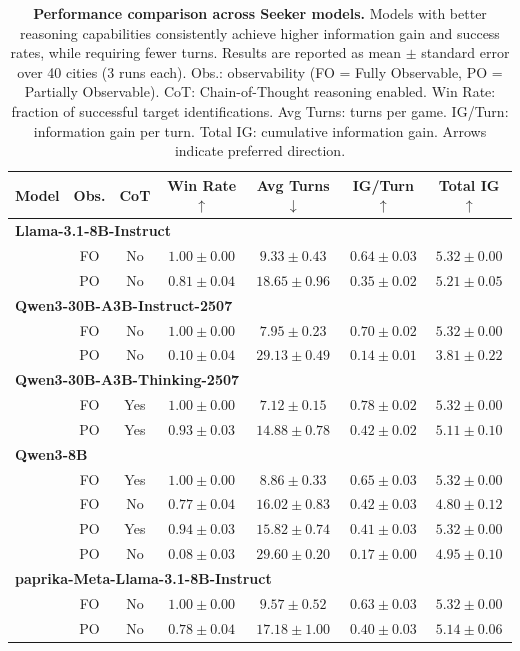 \documentclass[letterpaper]{article} %
\begin{document}
\begin{table}[t]
\centering
\setlength{\tabcolsep}{1.0mm}
\small
\begin{tabular}{lcccccc}
\toprule
\textbf{Model} & \textbf{Obs.} & \textbf{CoT} & \textbf{Win Rate} $\uparrow$ & \textbf{Avg Turns} $\downarrow$ & \textbf{IG/Turn} $\uparrow$ & \textbf{Total IG} $\uparrow$ \\
\midrule
\multicolumn{7}{l}{\textbf{Llama-3.1-8B-Instruct}} \\
    & FO & No & $1.00 \pm 0.00$ & $9.33 \pm 0.43$ & $0.64 \pm 0.03$ & $5.32 \pm 0.00$ \\
    & PO & No & $0.81 \pm 0.04$ & $18.65 \pm 0.96$ & $0.35 \pm 0.02$ & $5.21 \pm 0.05$ \\
\midrule
\multicolumn{7}{l}{\textbf{Qwen3-30B-A3B-Instruct-2507}} \\
    & FO & No & $1.00 \pm 0.00$ & $7.95 \pm 0.23$ & $0.70 \pm 0.02$ & $5.32 \pm 0.00$ \\
    & PO & No & $0.10 \pm 0.04$ & $29.13 \pm 0.49$ & $0.14 \pm 0.01$ & $3.81 \pm 0.22$ \\
\midrule
\multicolumn{7}{l}{\textbf{Qwen3-30B-A3B-Thinking-2507}} \\
    & FO & Yes & $1.00 \pm 0.00$ & $7.12 \pm 0.15$ & $0.78 \pm 0.02$ & $5.32 \pm 0.00$ \\
    & PO & Yes & $0.93 \pm 0.03$ & $14.88 \pm 0.78$ & $0.42 \pm 0.02$ & $5.11 \pm 0.10$ \\
\midrule
\multicolumn{7}{l}{\textbf{Qwen3-8B}} \\
    & FO & Yes & $1.00 \pm 0.00$ & $8.86 \pm 0.33$ & $0.65 \pm 0.03$ & $5.32 \pm 0.00$ \\
    & FO & No & $0.77 \pm 0.04$ & $16.02 \pm 0.83$ & $0.42 \pm 0.03$ & $4.80 \pm 0.12$ \\
    & PO & Yes & $0.94 \pm 0.03$ & $15.82 \pm 0.74$ & $0.41 \pm 0.03$ & $5.32 \pm 0.00$ \\
    & PO & No & $0.08 \pm 0.03$ & $29.60 \pm 0.20$ & $0.17 \pm 0.00$ & $4.95 \pm 0.10$ \\
\midrule
\multicolumn{7}{l}{\textbf{paprika-Meta-Llama-3.1-8B-Instruct}} \\
    & FO & No & $1.00 \pm 0.00$ & $9.57 \pm 0.52$ & $0.63 \pm 0.03$ & $5.32 \pm 0.00$ \\
    & PO & No & $0.78 \pm 0.04$ & $17.18 \pm 1.00$ & $0.40 \pm 0.03$ & $5.14 \pm 0.06$ \\
\bottomrule
\end{tabular}
\caption{\textbf{Performance comparison across Seeker models.} Models with better reasoning 
capabilities consistently achieve higher 
information gain and success rates, while requiring 
fewer turns. Results are reported as mean $\pm$ standard error over 40 cities (3 runs each). Obs.: observability (FO = Fully Observable, PO = Partially Observable). CoT: Chain-of-Thought reasoning enabled. Win Rate: fraction of successful target identifications. Avg Turns: turns per game. IG/Turn: information gain per turn. Total IG: cumulative information gain. Arrows indicate preferred direction.}
\label{tab:results}
\end{table}
\end{document}
